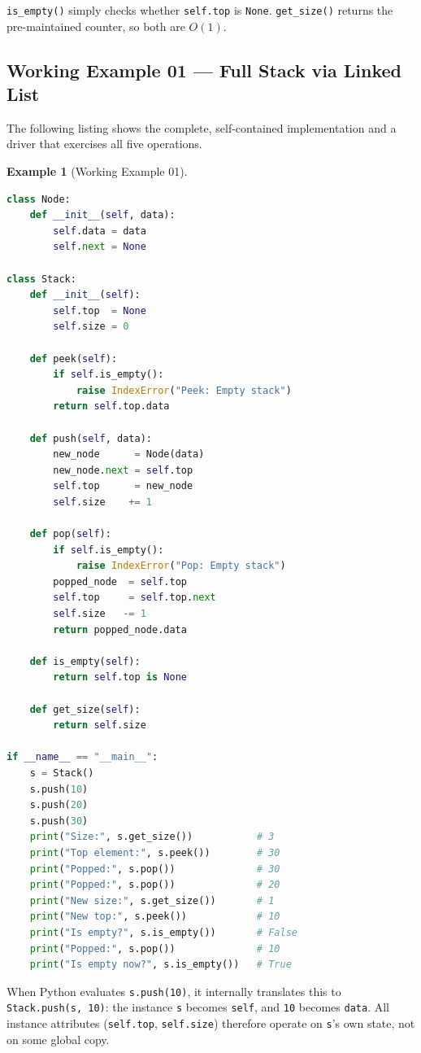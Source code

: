 \documentclass[11pt, a4paper, notitlepage]{report}
\theoremstyle{definition}
\theoremstyle{remark}
\theoremstyle{definition}
\newtheorem{example}[theorem]{Example}
\begin{document}
\texttt{is\_empty()} simply checks whether \texttt{self.top} is \texttt{None}.
\texttt{get\_size()} returns the pre-maintained counter, so both are $O(1)$.

\subsection{Working Example 01 --- Full Stack via Linked List}
\label{subsec:stack-example1}

The following listing shows the complete, self-contained implementation and a
driver that exercises all five operations.

\begin{example}[Working Example 01]
\label{ex:stack-working1}
\leavevmode
\begin{lstlisting}[language=Python]
class Node:
    def __init__(self, data):
        self.data = data
        self.next = None

class Stack:
    def __init__(self):
        self.top  = None
        self.size = 0

    def peek(self):
        if self.is_empty():
            raise IndexError("Peek: Empty stack")
        return self.top.data

    def push(self, data):
        new_node      = Node(data)
        new_node.next = self.top
        self.top      = new_node
        self.size    += 1

    def pop(self):
        if self.is_empty():
            raise IndexError("Pop: Empty stack")
        popped_node  = self.top
        self.top     = self.top.next
        self.size   -= 1
        return popped_node.data

    def is_empty(self):
        return self.top is None

    def get_size(self):
        return self.size

if __name__ == "__main__":
    s = Stack()
    s.push(10)
    s.push(20)
    s.push(30)
    print("Size:", s.get_size())           # 3
    print("Top element:", s.peek())        # 30
    print("Popped:", s.pop())              # 30
    print("Popped:", s.pop())              # 20
    print("New size:", s.get_size())       # 1
    print("New top:", s.peek())            # 10
    print("Is empty?", s.is_empty())       # False
    print("Popped:", s.pop())              # 10
    print("Is empty now?", s.is_empty())   # True
\end{lstlisting}
\end{example}

\begin{examtip}[title={Exam Tip: Method Call Translation}]
When Python evaluates \texttt{s.push(10)}, it internally translates this to
\texttt{Stack.push(s,~10)}: the instance \texttt{s} becomes \texttt{self}, and
\texttt{10} becomes \texttt{data}. All instance attributes (\texttt{self.top},
\texttt{self.size}) therefore operate on \texttt{s}'s own state, not on some
global copy.
\end{examtip}
\end{document}
